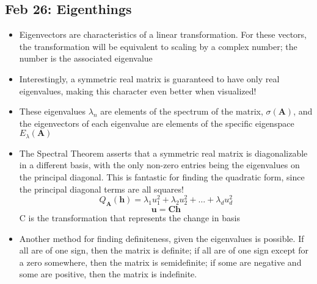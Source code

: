 \documentclass[10pt, oneside]{article}
\renewcommand{\vec}[1]{\mathbf{#1}}
\newcommand{\mat}[1]{\mathbf{#1}}
\begin{document}
\subsection{Feb 26: Eigenthings}
\begin{itemize}
    \item Eigenvectors are characteristics of a linear transformation. For these vectors, the transformation will be equivalent to scaling by a complex number; the number is the associated eigenvalue
    \item Interestingly, a symmetric real matrix is guaranteed to have only real eigenvalues, making this character even better when visualized!
    \item These eigenvalues $\lambda_n$ are elements of the spectrum of the matrix, $\sigma(\mat{A})$, and the eigenvectors of each eigenvalue are elements of the specific eigenspace $E_\lambda (\mat{A})$
    \item The Spectral Theorem asserts that a symmetric real matrix is diagonalizable in a different basis, with the only non-zero entries being the eigenvalues on the principal diagonal. This is fantastic for finding the quadratic form, since the principal diagonal terms are all squares!
        \[Q_\mat{A} (\vec{h}) = \lambda_1 u_1^2 + \lambda_2 u_2^2 + \hdots + \lambda_d u_d^2\]
        \[\vec{u} = \mat{C}\vec{h}\]
        C is the transformation that represents the change in basis
    \item Another method for finding definiteness, given the eigenvalues is possible. If all are of one sign, then the matrix is definite; if all are of one sign except for a zero somewhere, then the matrix is semidefinite; if some are negative and some are positive, then the matrix is indefinite. 
\end{itemize}
\end{document}
